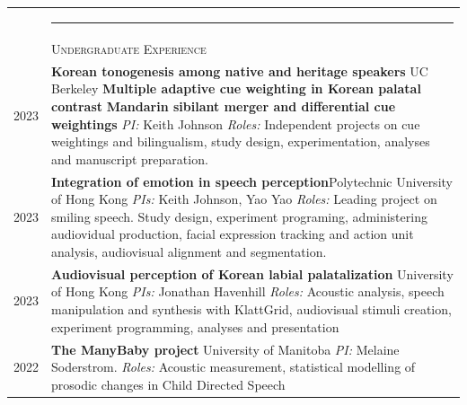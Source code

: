 \documentclass[letterpaper, 11pt]{article}
\newcommand{\headingfont}{\Large\color{black}}
\newenvironment{SectionTable}[1]{
	\renewcommand*{\arraystretch}{1.5}
	\setlength{\tabcolsep}{10pt}
	\begin{longtable}{Rp{6.3in}} & #1 \vspace{0.13cm}\hrule\\}
{\end{longtable}\vspace{-.3cm}}
\begin{document}
\begin{SectionTable}{\headingfont{\textbf{\textsc{Research Experience}}}}

&\textsc{Undergraduate Experience}\\
 2023 &
 \textbf{Korean tonogenesis among native and heritage speakers} \hfill{UC Berkeley}\newline
 \textbf{Multiple adaptive cue weighting in Korean palatal contrast}\newline
 \textbf{Mandarin sibilant merger and differential cue weightings}\newline
	\textit{PI:} Keith Johnson\newline
	\textit{Roles:} Independent projects on cue weightings and bilingualism, study design, experimentation, analyses and manuscript preparation.
	\\
2023 &
	\textbf{Integration of emotion in speech perception}\hfill Polytechnic University of Hong Kong\newline 
	\textit{PIs:} Keith Johnson, Yao Yao\newline
	\textit{Roles:} Leading project on smiling speech. Study design, experiment programing, administering audiovidual production, facial expression tracking and action unit analysis, audiovisual alignment and segmentation.\\
2023 &
\textbf{Audiovisual perception of Korean labial palatalization} \hfill University of Hong Kong \newline
	\textit{PIs:} Jonathan Havenhill\newline
	\textit{Roles:} Acoustic analysis, speech manipulation and synthesis with KlattGrid, audiovisual stimuli creation, experiment programming, analyses and presentation\\

2022 &
\textbf{The ManyBaby project} \hfill University of Manitoba \newline \textit{PI:} Melaine Soderstrom. \newline
\textit{Roles:} Acoustic measurement, statistical modelling of prosodic changes in Child Directed Speech\\


\end{SectionTable}
\end{document}
